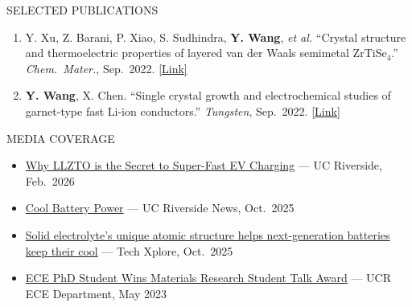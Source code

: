 \documentclass{resume} %
\begin{document}
\begin{rSection}{SELECTED PUBLICATIONS}
\begin{enumerate}
\item Y. Xu, Z. Barani, P. Xiao, S. Sudhindra, \textbf{Y. Wang}, \textit{et al.}
``Crystal structure and thermoelectric properties of layered van der Waals semimetal ZrTiSe$_4$.''
\textit{Chem.\ Mater.}, Sep.\ 2022.
\href{https://doi.org/10.1021/acs.chemmater.2c02155}{[Link]}

\item \textbf{Y. Wang}, X. Chen.
``Single crystal growth and electrochemical studies of garnet-type fast Li-ion conductors.''
\textit{Tungsten}, Sep.\ 2022.
\href{https://doi.org/10.1007/s42864-022-00176-z}{[Link]}

\end{enumerate}
\end{rSection}

\begin{rSection}{MEDIA COVERAGE}
\begin{itemize}
\itemsep 0.1em
\item \href{https://www.youtube.com/watch?v=dPwabntYj9s}{Why LLZTO is the Secret to Super-Fast EV Charging} --- UC Riverside, Feb.\ 2026
\item \href{https://news.ucr.edu/articles/2025/10/22/cool-battery-power}{Cool Battery Power} --- UC Riverside News, Oct.\ 2025
\item \href{https://techxplore.com/news/2025-10-solid-electrolyte-unique-atomic-generation.html}{Solid electrolyte's unique atomic structure helps next-generation batteries keep their cool} --- Tech Xplore, Oct.\ 2025
\item \href{https://ece.ucr.edu/news/2023/05/10/ece-phd-student-wins-materials-research-student-talk-award}{ECE PhD Student Wins Materials Research Student Talk Award} --- UCR ECE Department, May 2023
\end{itemize}
\end{rSection}


 
\end{document}
